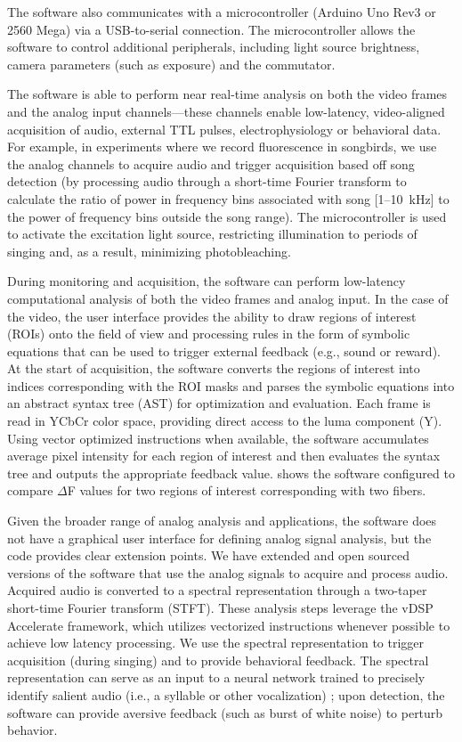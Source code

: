 The software also communicates with a microcontroller 
(Arduino Uno Rev3 or 2560 Mega) via a USB-to-serial connection. The 
microcontroller allows the software to control additional 
peripherals, including light source brightness, camera parameters 
(such as exposure) and the commutator.

The software is able to perform near real-time analysis on both the 
video frames and the analog input channels---these channels enable
low-latency, video-aligned acquisition of audio, external TTL 
pulses, electrophysiology or behavioral data. 
For example, in experiments where we record fluorescence in songbirds, 
we use the analog channels to acquire audio and trigger acquisition 
based off song detection (by processing audio through a short-time
Fourier transform to calculate the ratio of power in frequency 
bins associated with song [1--10~kHz] to the power of frequency bins outside 
the song range). The microcontroller is used to activate 
the excitation light source, restricting illumination to periods of 
singing and, as a result, minimizing photobleaching. 

During monitoring and acquisition, the software can perform low-latency
computational analysis of both the video frames and analog input. In 
the case of the video, the user interface provides the ability to 
draw regions of interest (ROIs) onto the field of view and processing 
rules in the form of symbolic equations that can be used to trigger 
external feedback (e.g., sound or reward). At the start of
acquisition, the software converts the regions of interest into indices 
corresponding with the ROI masks and parses the symbolic equations 
into an abstract syntax tree (AST) for optimization and evaluation. 
Each frame is read in YCbCr color 
space, providing direct access to the luma component (Y). Using vector
optimized instructions when available, the software accumulates average 
pixel intensity for each region of interest and then evaluates the 
syntax tree and outputs the appropriate feedback value.  
shows the software configured to compare $\Delta$F values for two 
regions of interest corresponding with two fibers.

Given the broader range of analog analysis and applications, 
the software does not have a graphical 
user interface for defining analog signal analysis, but the code provides clear 
extension points. We have extended and open sourced versions 
of the software that use the analog signals to acquire and process 
audio. Acquired audio is converted to a spectral representation 
through a two-taper short-time Fourier transform (STFT). These 
analysis steps leverage the vDSP Accelerate framework, which 
utilizes vectorized instructions whenever possible to achieve 
low latency processing. We use the spectral representation to 
trigger acquisition (during singing) and to provide behavioral
feedback. The spectral 
representation can serve as an input to a neural network trained 
to precisely identify salient audio (i.e., a syllable or other 
vocalization) \cite{Pearre:2017cs}; upon detection, the software 
can provide aversive feedback (such as burst of white noise) 
to perturb behavior.

